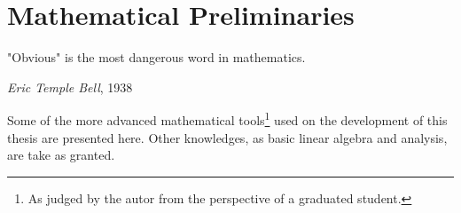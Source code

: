 \chapter{Mathematical Preliminaries}

\epigraph{"Obvious" is the most dangerous word in mathematics.}{\textit{Eric Temple
Bell}, 1938}

Some of the more advanced mathematical tools\footnote{As judged by the autor
from the perspective of a graduated student.} used on the development of this
thesis are presented here.
Other knowledges, as basic linear algebra and analysis, are take as granted.



